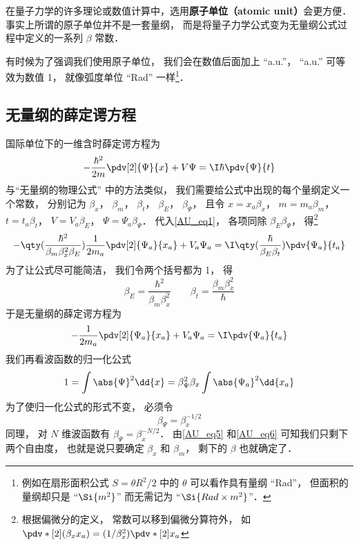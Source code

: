 

在量子力学的许多理论或数值计算中，选用\textbf{原子单位（atomic unit）}会更方便． 事实上所谓的原子单位并不是一套量纲， 而是将量子力学公式变为无量纲公式过程中定义的一系列 $\beta$ 常数．

有时候为了强调我们使用原子单位， 我们会在数值后面加上 “a.u.”， “a.u.” 可等效为数值 1， 就像弧度单位 “Rad” 一样\footnote{例如在扇形面积公式 $S = \theta R^2/2$ 中的 $\theta$ 可以看作具有量纲 “Rad”， 但面积的量纲却只是 “$\Si{m^2}$” 而无需记为 “$\Si{Rad\times m^2}$”．}．

\subsection{无量纲的薛定谔方程}
国际单位下的一维含时薛定谔方程为
\begin{equation}\label{AU_eq1}
-\frac{\hbar^2}{2m} \pdv[2]{\Psi}{x} + V\Psi= \I\hbar \pdv{\Psi}{t}
\end{equation}
与“无量纲的物理公式” 中的方法类似， 我们需要给公式中出现的每个量纲定义一个常数， 分别记为 $\beta_x$， $\beta_m$， $\beta_t$， $\beta_E$， $\beta_\Psi$， 且令 $x = x_a\beta_x$， $m = m_a\beta_m$， $t = t_a\beta_t$， $V = V_a\beta_E$， $\Psi = \Psi_a \beta_\Psi$．
代入\autoref{AU_eq1}， 各项同除 $\beta_E\beta_\Psi$， 得\footnote{根据偏微分的定义， 常数可以移到偏微分算符外， 如 $\pdv*[2]{(\beta_x x_a)} = (1/\beta_x^2) \pdv*[2]{x_a}$}
\begin{equation}
-\qty(\frac{\hbar^2}{\beta_m\beta_x^2\beta_E})\frac{1}{2m_a} \pdv[2]{\Psi_a}{x_a} + V_a\Psi_a= \I\qty(\frac{\hbar}{\beta_E\beta_t})\pdv{\Psi_a}{t_a}
\end{equation}
为了让公式尽可能简洁， 我们令两个括号都为 1， 得
\begin{equation}\label{AU_eq6}
\beta_E = \frac{\hbar^2}{\beta_m\beta_x^2}
\qquad
\beta_t = \frac{\beta_m\beta_x^2}{\hbar}
\end{equation}
于是无量纲的薛定谔方程为
\begin{equation}\label{AU_eq4}
-\frac{1}{2m_a} \pdv[2]{\Psi_a}{x_a} + V_a\Psi_a= \I\pdv{\Psi_a}{t_a}
\end{equation}
我们再看波函数的归一化公式
\begin{equation}
1 = \int \abs{\Psi}^2 \dd{x} = \beta_\Psi^2 \beta_x \int \abs{\Psi_a}^2 \dd{x_a}
\end{equation}
为了使归一化公式的形式不变， 必须令
\begin{equation}\label{AU_eq5}
\beta_\Psi = \beta_x^{-1/2}
\end{equation}
同理， 对 $N$ 维波函数有 $\beta_\Psi = \beta_x^{-N/2}$．
由\autoref{AU_eq5} 和\autoref{AU_eq6} 可知我们只剩下两个自由度， 也就是说只要确定 $\beta_x$ 和 $\beta_m$， 剩下的 $\beta$ 也就确定了．

